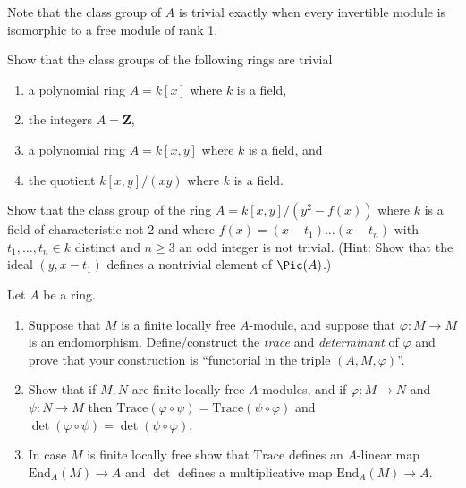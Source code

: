\noindent
Note that the class group of $A$ is trivial exactly when every invertible
module is isomorphic to a free module of rank 1.

\begin{exercise}
\label{exercise-class-group-trivial}
Show that the class groups of the following rings are trivial
\begin{enumerate}
\item a polynomial ring $A = k[x]$ where $k$ is a field,
\item the integers $A = \mathbf{Z}$,
\item a polynomial ring $A = k[x, y]$ where $k$ is a field, and
\item the quotient $k[x, y]/(xy)$ where $k$ is a field.
\end{enumerate}
\end{exercise}

\begin{exercise}
\label{exercise-class-group-not-trivial}
Show that the class group of the ring
$A = k[x, y]/(y^2 - f(x))$ where $k$ is a field of characteristic not $2$
and where $f(x) = (x - t_1) \ldots (x - t_n)$ with $t_1, \ldots, t_n \in k$
distinct and $n \geq 3$ an odd integer is not trivial. (Hint: Show that the
ideal $(y, x - t_1)$ defines a nontrivial element of $\Pic(A)$.)
\end{exercise}

\begin{exercise}
\label{exercise-trace-det}
Let $A$ be a ring.
\begin{enumerate}
\item Suppose that $M$ is a finite locally free $A$-module, and
suppose that $\varphi : M \to M$ is an endomorphism. Define/construct
the {\it trace}  and {\it determinant} of $\varphi$ and prove that your
construction is ``functorial in the triple $(A, M, \varphi)$''.
\item Show that if $M, N$ are finite locally free $A$-modules,
and if $\varphi : M \to N$ and $\psi : N \to M$ then
$\text{Trace}(\varphi \circ \psi) = \text{Trace}(\psi \circ \varphi)$ and
$\det(\varphi \circ \psi) = \det(\psi \circ \varphi)$.
\item In case $M$ is finite locally free show that
$\text{Trace}$ defines an $A$-linear map $\text{End}_A(M) \to A$ and
$\det$ defines a multiplicative map $\text{End}_A(M) \to A$.
\end{enumerate}
\end{exercise}

